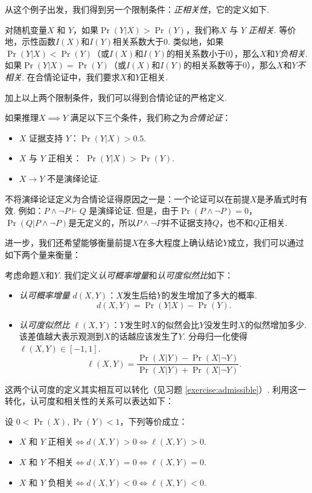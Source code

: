 从这个例子出发，我们得到另一个限制条件：\textit{正相关性}，它的定义如下. 

\begin{definition}[相关性]
    对随机变量$X$ 和 $Y$，如果$\Pr(Y|X) > \Pr(Y)$，我们称$X$ 与 $Y$ \textit{正相关}. 等价地，示性函数$I(X)$和$I(Y)$相关系数大于$0$. 类似地，如果$\Pr(Y|X) < \Pr(Y)$（或$I(X)$和$I(Y)$的相关系数小于$0$），那么$X$和$Y$\textit{负相关}. 如果$\Pr(Y|X) = \Pr(Y)$（或$I(X)$和$I(Y)$的相关系数等于$0$），那么$X$和$Y$\textit{不相关}. 在合情论证中，我们要求$X$和$Y$正相关.
\end{definition}

加上以上两个限制条件，我们可以得到合情论证的严格定义.

\begin{definition}[合情论证]
    如果推理$X \implies Y$ 满足以下三个条件，我们称之为\textit{合情论证}：
	\begin{itemize}
	\item $X$ 证据支持 $Y$：$\Pr(Y|X)>0.5$.
	\item $X$ 与 $Y$ 正相关： $\Pr(Y|X) > \Pr(Y)$. 
	\item $X\rightarrow Y$ 不是演绎论证.
	\end{itemize}
\end{definition}

不将演绎论证定义为合情论证得原因之一是：一个论证可以在前提$X$是矛盾式时有效. 例如：$P \wedge \neg P \vdash Q$ 是演绎论证. 但是，由于$\Pr(P \wedge \neg P) = 0$，$\Pr(Q | P \wedge \neg P)$是无定义的，所以$P \wedge \neg P$并不证据支持$Q$，也不和$Q$正相关.

进一步，我们还希望能够衡量前提$X$在多大程度上确认结论$Y$成立，我们可以通过如下两个量来衡量：
\begin{definition}[认可度]
考虑命题$X$和$Y$. 我们定义\textit{认可概率增量}和\textit{认可度似然比}如下：
\begin{itemize}
\item \textit{认可概率增量} $d(X, Y)$：$X$发生后给$Y$的发生增加了多大的概率.
\[
    d(X, Y) = \Pr(Y|X) - \Pr(Y).
\]
\item \textit{认可度似然比} $\ell(X, Y)$：$Y$发生时$X$的似然会比$Y$没发生时$X$的似然增加多少. 该差值越大表示观测到$X$的话越应该发生了$Y$. 分母归一化使得$\ell(X,Y)\in[-1,1]$.
\[
    \ell(X, Y) = \frac{\Pr(X|Y) - \Pr(X|\neg Y)}{\Pr(X|Y) + \Pr(X|\neg Y)}.
\]
\end{itemize} 
\end{definition}

这两个认可度的定义其实相互可以转化（见习题 \ref{exercise:admissible}）. 利用这一转化，认可度和相关性的关系可以表达如下：
\begin{proposition}
    设 $0< \Pr(X),\Pr(Y) < 1$，下列等价成立：
    \begin{itemize}
        \item $X$ 和 $Y$ 正相关$\iff d(X,Y) > 0\iff \ell(X, Y) > 0$.
        \item $X$ 和 $Y$ 不相关$\iff d(X, Y) = 0\iff \ell(X, Y) = 0$. 
        \item $X$ 和 $Y$ 负相关$\iff d(X,Y) < 0\iff\ell(X, Y) < 0$.
    \end{itemize}    
\end{proposition}


